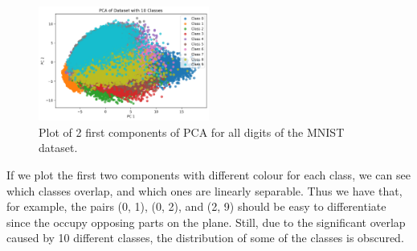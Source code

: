 \documentclass{article}
\begin{document}
\begin{figure}[h!]
    \centering
    \includegraphics[width=0.5\textwidth]{./plots/plot1.png}  %
    \caption{Plot of 2 first components of PCA for all digits of the MNIST dataset.}
    \label{fig:plot1}  %
\end{figure}

If we plot the first two components with different colour for each class, we can see which classes overlap, and which ones are linearly separable.
Thus we have that, for example, the pairs (0, 1), (0, 2), and (2, 9) should be easy to differentiate since the occupy opposing parts on the plane.
Still, due to the significant overlap caused by 10 different classes, the distribution of some of the classes is obscured. 
\end{document}
